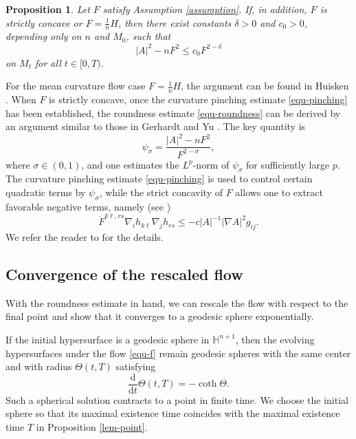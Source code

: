 \documentclass[11pt,reqno]{amsart}
\newtheorem{proposition}{Proposition}[section]
\theoremstyle{remark}
\numberwithin{equation}{section}
\begin{document}
\begin{proposition}
	\label{prop-roundness}
	Let $F$ satisfy Assumption \ref{assumption}. If, in addition, $F$ is strictly concave or $F=\frac{1}{n}H$, then there exist constants $\delta>0$ and $c_0>0$, depending only on $n$ and $M_0$, such that
	\begin{equation}
		|A|^2 - nF^2 \leq c_0 F^{2-\delta}
		\label{equ-roundness}
	\end{equation}
    on $M_t$ for all $t\in [0,T)$.
\end{proposition}

For the mean curvature flow case $F=\frac{1}{n}H$, the argument can be found in Huisken \cite{Hui86,Hui8602,Hui87}. When $F$ is strictly concave, once the curvature pinching estimate \eqref{equ-pinching} has been established, the roundness estimate \eqref{equ-roundness} can be derived by an argument similar to those in Gerhardt \cite{Ger15} and Yu \cite{Yu16}. The key quantity is
\begin{equation*}
	\psi_{\sigma}=\dfrac{|A|^2-nF^2}{F^{2-\sigma}},
\end{equation*}
where $\sigma\in(0,1)$, and one estimates the $L^p$-norm of $\psi_\sigma$ for sufficiently large $p$. The curvature pinching estimate \eqref{equ-pinching} is used to control certain quadratic terms by $\psi_\sigma$, while the strict concavity of $F$ allows one to extract favorable negative terms, namely (see \cite[Lemma 7.12]{And94})
\[
\ddot{F}^{k\ell,rs}\nabla_i h_{k\ell}\nabla_j h_{rs} \leq -c |A|^{-1}|\nabla A|^2g_{ij}.
\]
We refer the reader to \cite{Ger15,Yu16} for the details.

\subsection{Convergence of the rescaled flow}

With the roundness estimate in hand, we can rescale the flow with respect to the final point and show that it converges to a geodesic sphere exponentially. 

If the initial hypersurface is a geodesic sphere in $\mathbb{H}^{n+1}$, then the evolving hypersurfaces under the flow \eqref{equ-f} remain geodesic spheres with the same center and with radius $\Theta(t,T)$ satisfying
\[
\frac{\mathrm{d}}{\mathrm{d}t}\Theta(t,T) = -\coth\Theta.
\]
Such a spherical solution contracts to a point in finite time. We choose the initial sphere so that its maximal existence time coincides with the maximal existence time $T$ in Proposition \ref{lem-point}.
\end{document}
